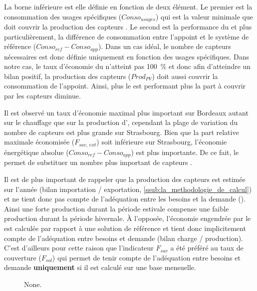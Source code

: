 La borne inférieure est elle définie en fonction de deux élément. Le premier est la
consommation des usages spécifiques ($Conso_{usages}$) qui
est la valeur minimale que doit couvrir la production des capteurs . Le second
est la performance du  et plus particulièrement, la différence
de consommation entre l’appoint et le système de référence ($Conso_{ref} - Conso_{app}$).
Dans un cas idéal, le nombre de capteurs  nécessaires est donc définie uniquement
en fonction des usages spécifiques. Dans notre cas, le taux d’économie du 
n’atteint pas \SI{100}{\percent} et donc afin d’atteindre un bilan positif, la
production des capteurs  ($Prod_{PV}$) doit aussi couvrir la consommation
de l’appoint. Ainsi, plus le  est performant plus la part à couvrir par les capteurs 
diminue.


Il est observé un taux d’économie maximal plus important sur Bordeaux autant sur le
chauffage que sur la production d’, cependant la plage de variation du
nombre de capteurs  est plus grande sur Strasbourg. Bien que la part relative
maximale économisée ($F_{sav,\,ext}$) soit inférieure sur Strasbourg, l’économie
énergétique absolue ($Conso_{ref} - Conso_{app}$) est plus importante. De ce fait,
le  permet de substituer un nombre plus important de capteurs .


Il est de plus important de rappeler que la production des capteurs  est estimée
sur l’année (bilan importation / exportation, \ref{ssub:la_methodologie_de_calcul}) et ne
tient donc pas compte de l’adéquation entre les besoins et la demande
(). Ainsi une forte production durant la période estivale
compense une faible production durant la période hivernale. À l’opposée, l’économie
engendrée par le  est calculée par rapport à une solution de référence et tient
donc implicitement compte de l’adéquation entre besoins et demande (bilan charge /
production). C’est d’ailleurs pour cette raison que l’indicateur $F_{sav}$ a été préféré
au taux de couverture ($F_{sol}$) qui permet de tenir compte de l’adéquation entre besoins
et demande \textbf{uniquement} si il est calculé sur une base mensuelle.

\begin{figure}
    \centering
    \caption[None]
             {None.}
    \label{fig:evolution_usages_pv}
\end{figure}

